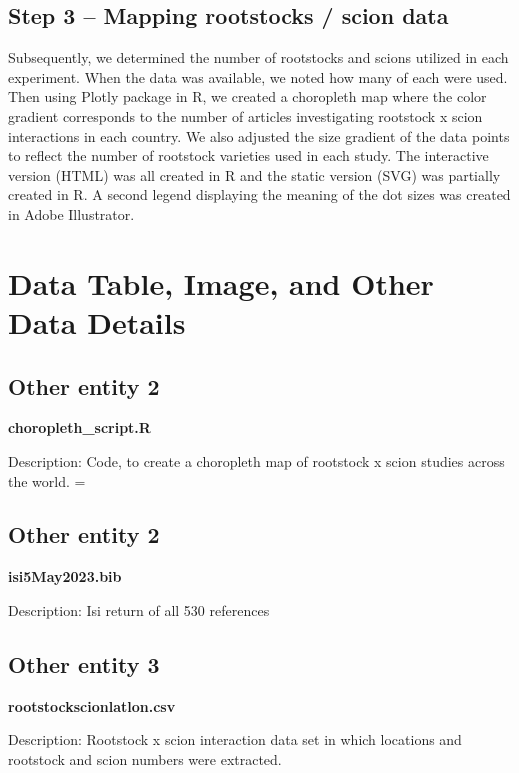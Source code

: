 \documentclass[11pt, oneside]{article}   	%
\begin{document}
\subsection{Step 3 – Mapping rootstocks / scion data}
Subsequently, we determined the number of rootstocks and scions utilized in each experiment. When the data was available, we noted how many of each were used. Then using Plotly package in R, we created a choropleth map where the color gradient corresponds to the number of articles investigating rootstock x scion interactions in each country. We also adjusted the size gradient of the data points to reflect the number of rootstock varieties used in each study. The interactive version (HTML) was all created in R and the static version (SVG) was partially created in R. A second legend displaying the meaning of the dot sizes was created in Adobe Illustrator.

\section{Data Table, Image, and Other Data Details}
\subsection{Other entity 2}
\textbf{choropleth\_script.R}

Description:
Code, to create a choropleth map of rootstock x scion studies across the world. =
\subsection{Other entity 2}
\textbf{isi5May2023.bib}

Description:
Isi return of all 530 references
\subsection{Other entity 3}
\textbf{rootstockscionlatlon.csv}

Description:
Rootstock x scion interaction data set in which locations and rootstock and scion numbers were extracted.
\end{document}
